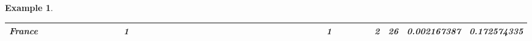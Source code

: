 \documentclass[a4paper,11pt]{report}
\newtheorem{example}[theorem]{Example}
\begin{document}
\begin{example}
\begin{appendices}
\begin{landscape}
\begin{longtable}{r|r|r|r|r|r|r|r|r|r|r|r|r|r|r|r|r|r|r|r|r|r|r|r|r|r|r|r|r|r|r|r|r|r|r|r|r|r|r|r|r|r|}
\multicolumn{1}{|r|}{\textbf{France}}          &                                       &                                       &                                       &                                          &                                       &                                       &                                       &                                       &                                                & 1                                     &                                      &                                       &                                       &                                      &                                       &                                       &                                       &                                      &                                     &                                      &                                         &                                     &                                       &                                          &                                      &                                      &                                        &                                       &                                      &                                          &                                        &                                     & 1                                    &                                           &                                               &                                       &                                              & 2                                    & 26                                  & 0.002167387                                   & 0.172574335                             \\ \hline

\end{longtable}
\end{landscape}
\end{appendices}
\end{example}
\end{document}
